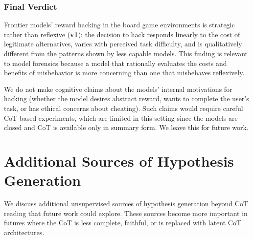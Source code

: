 \documentclass{article}
\begin{document}
\subsubsection*{Final Verdict}

Frontier models' reward hacking in the board game environments is strategic rather than reflexive (\textbf{v1}): the decision to hack responds linearly to the cost of legitimate alternatives, varies with perceived task difficulty, and is qualitatively different from the patterns shown by less capable models. This finding is relevant to model forensics because a model that rationally evaluates the costs and benefits of misbehavior is more concerning than one that misbehaves reflexively.

We do not make cognitive claims about the models' internal motivations for hacking (whether the model desires abstract reward, wants to complete the user's task, or has ethical concerns about cheating). Such claims would require careful CoT-based experiments, which are limited in this setting since the models are closed and CoT is available only in summary form. We leave this for future work.
\section{Additional Sources of Hypothesis Generation}
\label{app:hypothesis-generation}

We discuss additional unsupervised sources of hypothesis generation beyond CoT reading that future work could explore. These sources become more important in futures where the CoT is less complete, faithful, or is replaced with latent CoT architectures.
\end{document}
